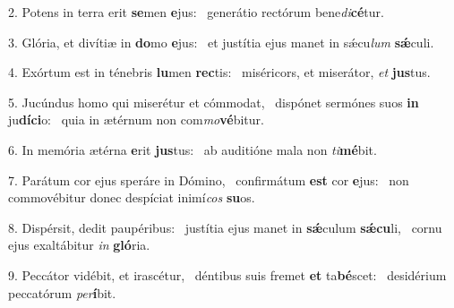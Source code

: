 2. Potens in terra erit \textbf{se}men \textbf{e}jus: \ast\  generátio rectórum bene\textit{di}\textbf{cé}tur.\

3. Glória, et divítiæ in \textbf{do}mo \textbf{e}jus: \ast\  et justítia ejus manet in sǽcu\textit{lum} \textbf{sǽ}culi.\

4. Exórtum est in ténebris \textbf{lu}men \textbf{rec}tis: \ast\  miséricors, et miserátor, \textit{et} \textbf{jus}tus.\

5. Jucúndus homo qui miserétur et cómmodat, \dag\  dispónet sermónes suos \textbf{in} ju\textbf{dí}\textbf{ci}o: \ast\  quia in ætérnum non com\textit{mo}\textbf{vé}bitur.\

6. In memória ætérna \textbf{e}rit \textbf{jus}tus: \ast\  ab auditióne mala non \textit{ti}\textbf{mé}bit.\

7. Parátum cor ejus speráre in Dómino, \dag\  confirmátum \textbf{est} cor \textbf{e}jus: \ast\  non commovébitur donec despíciat inimí\textit{cos} \textbf{su}os.\

8. Dispérsit, dedit paupéribus: \dag\  justítia ejus manet in \textbf{sǽ}culum \textbf{sǽ}\textbf{cu}li, \ast\  cornu ejus exaltábitur \textit{in} \textbf{gló}ria.\

9. Peccátor vidébit, et irascétur, \dag\  déntibus suis fremet \textbf{et} ta\textbf{bé}scet: \ast\  desidérium peccatórum \textit{per}\textbf{í}bit.\


